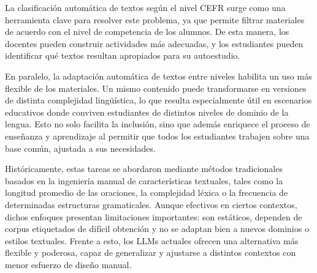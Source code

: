 La clasificación automática de textos según el nivel CEFR surge como una herramienta clave para resolver este problema, ya que permite filtrar materiales de acuerdo con el nivel de competencia de los alumnos. De esta manera, los docentes pueden construir actividades más adecuadas, y los estudiantes pueden identificar qué textos resultan apropiados para su autoestudio.

En paralelo, la adaptación automática de textos entre niveles habilita un uso más flexible de los materiales. Un mismo contenido puede transformarse en versiones de distinta complejidad lingüística, lo que resulta especialmente útil en escenarios educativos donde conviven estudiantes de distintos niveles de dominio de la lengua. Esto no solo facilita la inclusión, sino que además enriquece el proceso de enseñanza y aprendizaje al permitir que todos los estudiantes trabajen sobre una base común, ajustada a sus necesidades.

Históricamente, estas tareas se abordaron mediante métodos tradicionales basados en la ingeniería manual de características textuales, tales como la longitud promedio de las oraciones, la complejidad léxica o la frecuencia de determinadas estructuras gramaticales. Aunque efectivos en ciertos contextos, dichos enfoques presentan limitaciones importantes: son estáticos, dependen de corpus etiquetados de difícil obtención y no se adaptan bien a nuevos dominios o estilos textuales. Frente a esto, los LLMs actuales ofrecen una alternativa más flexible y poderosa, capaz de generalizar y ajustarse a distintos contextos con menor esfuerzo de diseño manual.

